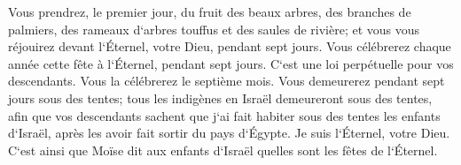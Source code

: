 \verse Vous prendrez, le premier jour, du fruit des beaux arbres, des branches de palmiers, des rameaux d`arbres touffus et des saules de rivière; et vous vous réjouirez devant l`Éternel, votre Dieu, pendant sept jours. 
\verse Vous célébrerez chaque année cette fête à l`Éternel, pendant sept jours. C`est une loi perpétuelle pour vos descendants. Vous la célébrerez le septième mois. 
\verse Vous demeurerez pendant sept jours sous des tentes; tous les indigènes en Israël demeureront sous des tentes, 
\verse afin que vos descendants sachent que j`ai fait habiter sous des tentes les enfants d`Israël, après les avoir fait sortir du pays d`Égypte. Je suis l`Éternel, votre Dieu. 
\verse C`est ainsi que Moïse dit aux enfants d`Israël quelles sont les fêtes de l`Éternel. 

\chapter{}

